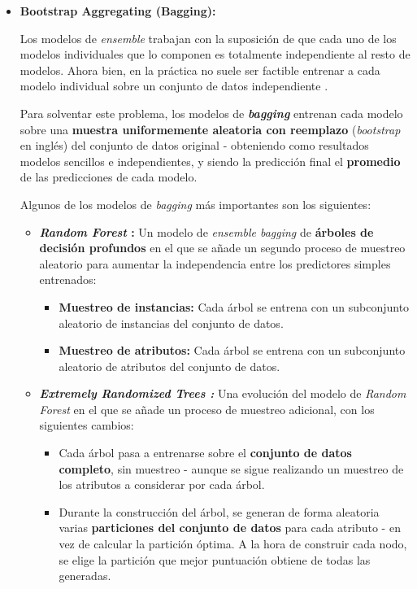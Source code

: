 \begin{itemize}

	\item \textbf{Bootstrap Aggregating (Bagging):} 
	
	Los modelos de \textit{ensemble} trabajan con la suposición de que cada uno de los modelos individuales que lo componen es totalmente independiente al resto de modelos. Ahora bien, en la práctica no suele ser factible entrenar a cada modelo individual sobre un conjunto de datos independiente \cite{baggingart}. 
	
	Para solventar este problema, los modelos de \textbf{\textit{bagging}} entrenan cada modelo sobre una \textbf{muestra uniformemente aleatoria con reemplazo} (\textit{bootstrap} en inglés) del conjunto de datos original \cite{baggingart} - obteniendo como resultados modelos sencillos e independientes, y siendo la predicción final el \textbf{promedio} de las predicciones de cada modelo.

	Algunos de los modelos de \textit{bagging} más importantes son los siguientes:
	
	\begin{itemize}
		\item \textbf{\textit{Random Forest} \cite{randomforests}:} Un modelo de \textit{ensemble bagging} de \textbf{árboles de decisión profundos} en el que se añade un segundo proceso de muestreo aleatorio para aumentar la independencia entre los predictores simples entrenados:
		\begin{itemize}
			\item \textbf{Muestreo de instancias:} Cada árbol se entrena con un subconjunto aleatorio de instancias del conjunto de datos.
			\item \textbf{Muestreo de atributos:} Cada árbol se entrena con un subconjunto aleatorio de atributos del conjunto de datos.
		\end{itemize}
		\item \textbf{\textit{Extremely Randomized Trees \cite{Geurts2006}:}} Una evolución del modelo de \textit{Random Forest} en el que se añade un proceso de muestreo adicional, con los siguientes cambios:
		\begin{itemize}
			\item Cada árbol pasa a entrenarse sobre el \textbf{conjunto de datos completo}, sin muestreo - aunque se sigue realizando un muestreo de los atributos a considerar por cada árbol.
			\item Durante la construcción del árbol, se generan de forma aleatoria varias \textbf{particiones del conjunto de datos} para cada atributo - en vez de calcular la partición óptima. A la hora de construir cada nodo, se elige la partición que mejor puntuación obtiene de todas las generadas.
		\end{itemize}
	\end{itemize}
	

\end{itemize}
